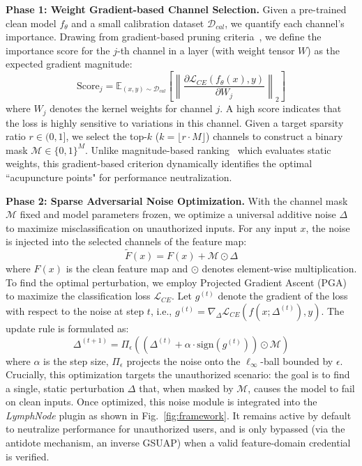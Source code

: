\documentclass[conference]{IEEEtran}
\begin{document}
\textbf{Phase 1: Weight Gradient-based Channel Selection.} 
Given a pre-trained clean model $f_\theta$ and a small calibration dataset $\mathcal{D}_{cal}$, we quantify each channel's importance. Drawing from gradient-based pruning criteria~\cite{molchanov2016pruning}, we define the importance score for the $j$-th channel in a layer (with weight tensor $W$) as the expected gradient magnitude:
\begin{equation}
\text{Score}_j = \mathbb{E}_{(x,y) \sim \mathcal{D}_{cal}} \left[ \left\| \frac{\partial \mathcal{L}_{CE}(f_\theta(x), y)}{\partial W_j} \right\|_2 \right]
\end{equation}
where $W_j$ denotes the kernel weights for channel $j$. A high score indicates that the loss is highly sensitive to variations in this channel. Given a target sparsity ratio $r \in (0, 1]$, we select the top-$k$ ($k = \lfloor r \cdot M \rfloor$) channels to construct a binary mask $\mathcal{M} \in \{0,1\}^M$. Unlike magnitude-based ranking~\cite{han2015learning} which evaluates static weights, this gradient-based criterion dynamically identifies the optimal ``acupuncture points" for performance neutralization.

\textbf{Phase 2: Sparse Adversarial Noise Optimization.} 
With the channel mask $\mathcal{M}$ fixed and model parameters frozen, we optimize a universal additive noise $\Delta$ to maximize misclassification on unauthorized inputs. For any input $x$, the noise is injected into the selected channels of the feature map:
\begin{equation}
    \tilde{F}(x) = F(x) + \mathcal{M} \odot \Delta
\end{equation}
where $F(x)$ is the clean feature map and $\odot$ denotes element-wise multiplication. To find the optimal perturbation, we employ Projected Gradient Ascent (PGA) to maximize the classification loss $\mathcal{L}_{CE}$. Let $g^{(t)}$ denote the gradient of the loss with respect to the noise at step $t$, i.e., $g^{(t)} = \nabla_{\Delta} \mathcal{L}_{CE}(f(x; \Delta^{(t)}), y)$. The update rule is formulated as:
\begin{equation}
    \Delta^{(t+1)} = \Pi_{\epsilon} \left( (\Delta^{(t)} + \alpha \cdot \text{sign}(g^{(t)})) \odot \mathcal{M} \right)
\end{equation}
where $\alpha$ is the step size, $\Pi_{\epsilon}$ projects the noise onto the $\ell_\infty$-ball bounded by $\epsilon$. Crucially, this optimization targets the unauthorized scenario: the goal is to find a single, static perturbation $\Delta$ that, when masked by $\mathcal{M}$, causes the model to fail on clean inputs. Once optimized, this noise module is integrated into the \textit{LymphNode} plugin as shown in Fig.~\ref{fig:framework}. It remains active by default to neutralize performance for unauthorized users, and is only bypassed (via the antidote mechanism, an inverse GSUAP) when a valid feature-domain credential is verified.
\end{document}
